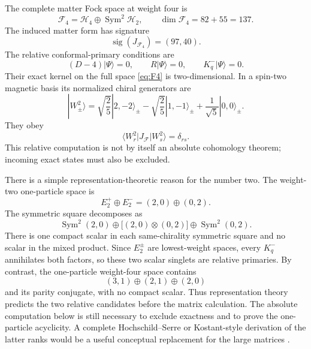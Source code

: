 \documentclass[11pt]{article}
\theoremstyle{definition}
\theoremstyle{remark}
\newcommand{\F}{\mathcal F}
\newcommand{\cH}{\mathcal H}
\begin{document}
The complete matter Fock space at weight four is
\begin{equation}\label{eq:F4}
 \F_4=\cH_4\oplus\operatorname{Sym}^2\cH_2,
 \qquad \dim\F_4=82+55=137.
\end{equation}
The induced matter form has signature
\begin{equation}\label{eq:F4-signature}
 \operatorname{sig}(J_{\F_4})=(97,40).
\end{equation}
The relative conformal-primary conditions are
\begin{equation}\label{eq:relative-conditions}
 (D-4)|\Psi\rangle=0,
 \qquad R|\Psi\rangle=0,
 \qquad K^-_q|\Psi\rangle=0.
\end{equation}
Their exact kernel on the full space \eqref{eq:F4} is two-dimensional.  In a
spin-two magnetic basis its normalized chiral generators are
\begin{equation}\label{eq:W-square-states}
 |W_\pm^2\rangle
 =\sqrt{\frac25}|2,-2\rangle_\pm
 -\sqrt{\frac25}|1,-1\rangle_\pm
 +\frac1{\sqrt5}|0,0\rangle_\pm.
\end{equation}
They obey
\begin{equation}\label{eq:relative-I2}
 \langle W_r^2|J_{\F}|W_s^2\rangle=\delta_{rs}.
\end{equation}
This relative computation is not by itself an absolute cohomology theorem;
incoming exact states must also be excluded.

There is a simple representation-theoretic reason for the number two.  The
weight-two one-particle space is
\begin{equation}
 E_2^+\oplus E_2^-=(2,0)\oplus(0,2).
\end{equation}
The symmetric square decomposes as
\begin{equation}
 \operatorname{Sym}^2(2,0)
 \oplus\bigl[(2,0)\otimes(0,2)\bigr]
 \oplus\operatorname{Sym}^2(0,2).
\end{equation}
There is one compact scalar in each same-chirality symmetric square and no
scalar in the mixed product.  Since $E_2^\pm$ are lowest-weight spaces,
every $K^-_q$ annihilates both factors, so these two scalar singlets are
relative primaries.  By contrast, the one-particle weight-four space
contains
\begin{equation}
 (3,1)\oplus(2,1)\oplus(2,0)
\end{equation}
and its parity conjugate, with no compact scalar.  Thus representation
theory predicts the two relative candidates before the matrix calculation.
The absolute computation below is still necessary to exclude exactness and
to prove the one-particle acyclicity.  A complete Hochschild--Serre or
Kostant-style derivation of the latter ranks would be a useful conceptual
replacement for the large matrices \cite{CapBGG}.
\end{document}
